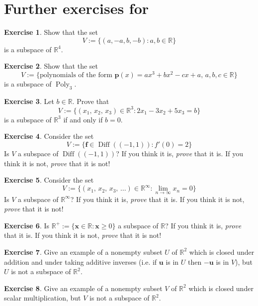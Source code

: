 \documentclass[a4paper,11pt]{book}
\theoremstyle{definition}
\newtheorem{exercise}{Exercise}
\newcommand{\ve}[1]{\mathbf{#1}}
\newcommand{\furtherexercises}{\section*{Further exercises for \thesection}}
\DeclareMathOperator{\Diff}{Diff}
\DeclareMathOperator{\Poly}{Poly}
\begin{document}
\furtherexercises

\begin{exercise} Show that the set 
\[
 V := \{ (a, -a, b, -b) : a, b \in \mathbb{R} \}
\]
is a subspace of $\mathbb{R}^4$.
\end{exercise}

\begin{exercise} Show that the set
\[
 V := \{ \mbox{polynomials of the form } \ve{p}(x) = ax^3 + bx^2 - cx + a, \, a,b,c \in \mathbb{R}\}
\]
is a subspace of $\Poly_3$.
\end{exercise}

\begin{exercise} Let $b \in \mathbb{R}$. Prove that 
\[
V := \{ (x_1, \, x_2, \, x_3) \in \mathbb{R}^3 : 2x_1 - 3x_2 + 5x_3 = b \}
\]
is a subspace of $\mathbb{R}^3$ if and only if $b=0$.
\end{exercise} 

\begin{exercise} Consider the set
\[
 V := \{ \mathbf{f} \in \Diff((-1, 1)) : f'(0) = 2 \}
\]
Is $V$ a subspace of $\Diff((-1,1))$? If you think it is, {\em prove} that it is. If you think it is not, {\em prove} that it is not!
\end{exercise}

\begin{exercise} Consider the set
\[
 V := \{ (x_1, \, x_2, \, x_3, \, \ldots) \in \mathbb{R}^\infty : \lim_{n \rightarrow \infty} x_n = 0 \}
\]
Is $V$ a subspace of $\mathbb{R}^\infty$? If you think it is, {\em prove} that it is. If you think it is not, {\em prove} that it is not! 
\end{exercise}

\begin{exercise} Is $\mathbb{R}^+ := \{ \ve{x} \in \mathbb{R} : \ve{x} \geq 0 \}$ a subspace of $\mathbb{R}$? If you think it is, {\em prove} that it is. If you think it is not, {\em prove} that it is not!
\end{exercise}

\begin{exercise} Give an example of a nonempty subset $U$ of $\mathbb{R}^2$ which is closed under addition and under taking additive inverses (i.e. if $\ve{u}$ is in $U$ then $-\ve{u}$ is in $V$), but $U$ is not a subspace of $\mathbb{R}^2$.
\end{exercise}

\begin{exercise} Give an example of a nonempty subset $V$ of $\mathbb{R}^2$ which is closed under scalar multiplication, but $V$ is not a subspace of $\mathbb{R}^2$.
\end{exercise}
\end{document}
